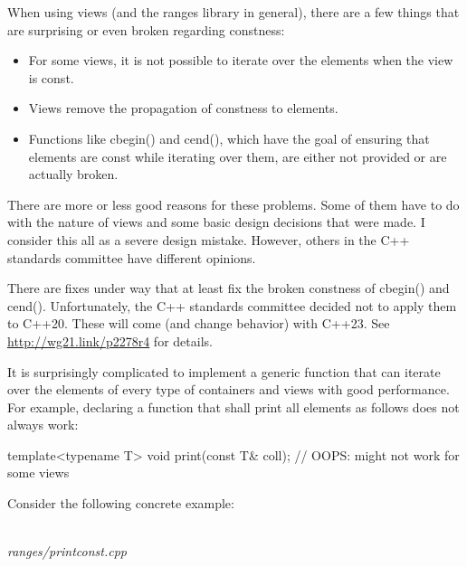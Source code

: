 
When using views (and the ranges library in general), there are a few things that are surprising or even broken regarding constness:

\begin{itemize}
\item
For some views, it is not possible to iterate over the elements when the view is const.

\item
Views remove the propagation of constness to elements.

\item
Functions like cbegin() and cend(), which have the goal of ensuring that elements are const while iterating over them, are either not provided or are actually broken.
\end{itemize}

There are more or less good reasons for these problems. Some of them have to do with the nature of views and some basic design decisions that were made. I consider this all as a severe design mistake. However, others in the C++ standards committee have different opinions.

There are fixes under way that at least fix the broken constness of cbegin() and cend(). Unfortunately, the C++ standards committee decided not to apply them to C++20. These will come (and change behavior) with C++23. See \url{http://wg21.link/p2278r4} for details.


It is surprisingly complicated to implement a generic function that can iterate over the elements of every type of containers and views with good performance. For example, declaring a function that shall print all elements as follows does not always work:

\begin{cpp}
template<typename T>
void print(const T& coll); // OOPS: might not work for some views
\end{cpp}

Consider the following concrete example:

\noindent
\hspace*{\fill} \\ %
\textit{ranges/printconst.cpp}

